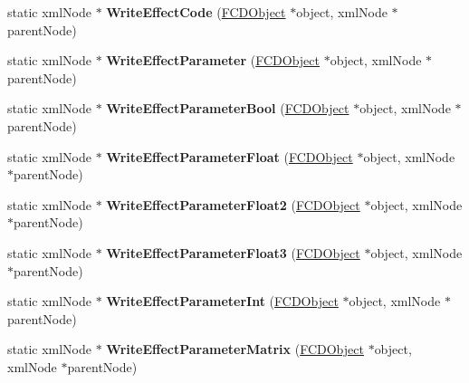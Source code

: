 \begin{DoxyCompactItemize}
\item 
\hypertarget{classFArchiveXML_a6eb2fb9f1669841c99e85ffffe4ddeac}{
static xmlNode $\ast$ {\bfseries WriteEffectCode} (\hyperlink{classFCDObject}{FCDObject} $\ast$object, xmlNode $\ast$parentNode)}
\label{classFArchiveXML_a6eb2fb9f1669841c99e85ffffe4ddeac}

\item 
\hypertarget{classFArchiveXML_af5e0b9d2642a61b4145338beb8b9ac24}{
static xmlNode $\ast$ {\bfseries WriteEffectParameter} (\hyperlink{classFCDObject}{FCDObject} $\ast$object, xmlNode $\ast$parentNode)}
\label{classFArchiveXML_af5e0b9d2642a61b4145338beb8b9ac24}

\item 
\hypertarget{classFArchiveXML_a206c5709c42abd2b8cedd16547b244ba}{
static xmlNode $\ast$ {\bfseries WriteEffectParameterBool} (\hyperlink{classFCDObject}{FCDObject} $\ast$object, xmlNode $\ast$parentNode)}
\label{classFArchiveXML_a206c5709c42abd2b8cedd16547b244ba}

\item 
\hypertarget{classFArchiveXML_aa2a03375ecc3203a35b9906cdfe26572}{
static xmlNode $\ast$ {\bfseries WriteEffectParameterFloat} (\hyperlink{classFCDObject}{FCDObject} $\ast$object, xmlNode $\ast$parentNode)}
\label{classFArchiveXML_aa2a03375ecc3203a35b9906cdfe26572}

\item 
\hypertarget{classFArchiveXML_a78c5460e56cf167cdd13430e40a6f446}{
static xmlNode $\ast$ {\bfseries WriteEffectParameterFloat2} (\hyperlink{classFCDObject}{FCDObject} $\ast$object, xmlNode $\ast$parentNode)}
\label{classFArchiveXML_a78c5460e56cf167cdd13430e40a6f446}

\item 
\hypertarget{classFArchiveXML_a2fe5995652c9d7f0e87478c2df247d19}{
static xmlNode $\ast$ {\bfseries WriteEffectParameterFloat3} (\hyperlink{classFCDObject}{FCDObject} $\ast$object, xmlNode $\ast$parentNode)}
\label{classFArchiveXML_a2fe5995652c9d7f0e87478c2df247d19}

\item 
\hypertarget{classFArchiveXML_a759d33b6880a60cf180fee446a2a1604}{
static xmlNode $\ast$ {\bfseries WriteEffectParameterInt} (\hyperlink{classFCDObject}{FCDObject} $\ast$object, xmlNode $\ast$parentNode)}
\label{classFArchiveXML_a759d33b6880a60cf180fee446a2a1604}

\item 
\hypertarget{classFArchiveXML_af20dbc06500fc9db1a0401dad4b0e277}{
static xmlNode $\ast$ {\bfseries WriteEffectParameterMatrix} (\hyperlink{classFCDObject}{FCDObject} $\ast$object, xmlNode $\ast$parentNode)}
\label{classFArchiveXML_af20dbc06500fc9db1a0401dad4b0e277}


\end{DoxyCompactItemize}
